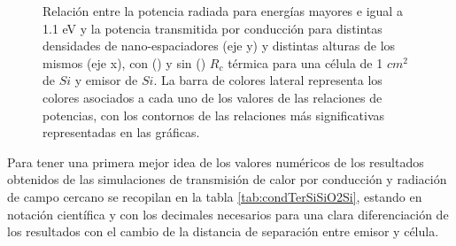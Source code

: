 \begin{figure}[H]
\begin{subfigure}[b]{0.49\textwidth}
	\caption{ }
	\label{fig:rel_SiSi11_Rc}
\end{subfigure}
\caption[Relación entre la potencia radiada para energías mayores e igual a 1.1 eV y la potencia transmitida por conducción para distintas densidades de nano-espaciadores (eje y) y distintas alturas de los mismos (eje x), con () y sin () $R_c$ térmica para una célula de 1 $cm^2$ de $Si$ y emisor de $Si$. La barra de colores lateral representa los colores asociados a cada uno de los valores de las relaciones de potencias, con los contornos de las relaciones más significativas representadas en las gráficas.]{\small  Relación entre la potencia radiada para energías mayores e igual a 1.1 eV y la potencia transmitida por conducción para distintas densidades de nano-espaciadores (eje y) y distintas alturas de los mismos (eje x), con () y sin () $R_c$ térmica para una célula de 1 $cm^2$ de $Si$ y emisor de $Si$. La barra de colores lateral representa los colores asociados a cada uno de los valores de las relaciones de potencias, con los contornos de las relaciones más significativas representadas en las gráficas.
}
	\label{fig:rels_SiSi11}
\end{figure}
Para tener una primera mejor idea de los valores numéricos de los resultados obtenidos de las simulaciones de transmisión de calor por conducción y radiación de campo cercano se recopilan en la tabla \ref{tab:condTerSiSiO2Si}, estando en notación científica y con los decimales necesarios para una clara diferenciación de los resultados con el cambio de la distancia de separación entre emisor y célula.
